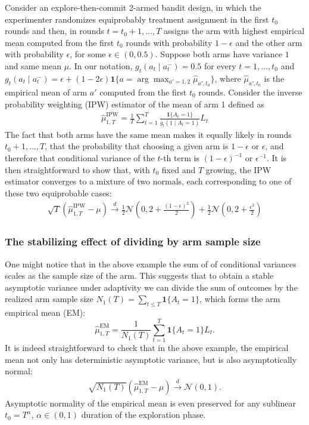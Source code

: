 Consider an explore-then-commit 2-armed bandit design, in which the experimenter randomizes equiprobably treatment assignment in the first $t_0$ rounds and then, in rounds $t=t_0+1,\ldots,T$ assigns the arm with highest empirical mean computed from the first $t_0$ rounds with probability $1-\epsilon$ and the other arm with probability $\epsilon$, for some $\epsilon \in (0,0.5)$. Suppose both arms have variance $1$ and same mean $\mu$. In our notation, $g_t(a_t \mid a_t^-) = 0.5$ for every $t=1,\ldots,t_0$ and $g_t(a_t \mid a_t^-) = \epsilon +  (1-2\epsilon) \bm{1}\{ a = \arg\max_{a'=1,2} \widehat{\mu}_{a',t_0} \}$, where $\widehat{\mu}_{a',t_0}$ is the empirical mean of arm $a'$ computed from the first $t_0$ rounds. Consider the inverse probability weighting (IPW) estimator of the mean of arm 1 defined as 
\begin{align*}
\widehat{\mu}_{1,T}^{\mathrm{IPW}} = \frac{1}{T} \sum_{t=1}^T \frac{\bm{1}\{A_t=1\}}{g_t(1 \mid A_t = 1)} L_t
\end{align*}
The fact that both arms have the same mean makes it equally likely in rounds $t_0+1,\ldots,T$, that the probability that choosing a given arm is $1-\epsilon$ or $\epsilon$, and therefore that conditional variance of the $t$-th term is $(1-\epsilon)^{-1}$ or $\epsilon^{-1}$.
It is then straightforward to show that, with $t_0$ fixed and $T$ growing, the IPW estimator converges to a mixture of two normals, each corresponding to one of these two equiprobable cases:
\begin{align*}
\sqrt{T} (\widehat{\mu}_{1,T}^{\mathrm{IPW}} - \mu) \xrightarrow{d} \frac{1}{2} \mathcal{N}\left(0, 2 +  \frac{(1-\epsilon)^2}{2} \right) + \frac{1}{2} \mathcal{N}\left(0, 2 +  \frac{\epsilon^2}{2} \right)
\end{align*}

\subsubsection{The stabilizing effect of dividing by arm sample size} One might notice that in the above example the sum of of conditional variances scales as the sample size of the arm. This suggests that to obtain a stable asymptotic variance under adaptivity we can divide the sum of outcomes by the realized arm sample size $N_1(T)=\sum_{t\leq T}\bm{1}\{A_t=1\}$, which forms the arm empirical mean (EM):
$$
\widehat{\mu}_{1,T}^{\mathrm{EM}}=\frac1{N_1(T)}\sum_{t=1}^T\bm{1}\{A_t=1\} L_t.
$$
It is indeed straightforward to check that in the above example, the empirical mean not only has deterministic asymptotic variance, but is also asymptotically normal:
\begin{align*}
\sqrt{N_1(T)} (\widehat{\mu}_{1,T}^{\mathrm{EM}} - \mu) \xrightarrow{d} \mathcal{N}(0,1).
\end{align*}
Asymptotic normality of the empirical mean is even preserved for any sublinear $t_0 = T^\alpha$, $\alpha \in (0,1)$ duration of the exploration phase. 

